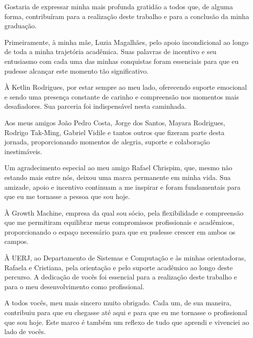 
Gostaria de expressar minha mais profunda gratidão a todos que, de alguma forma, contribuíram para a realização deste trabalho e para a conclusão da minha graduação.

Primeiramente, à minha mãe, Luzia Magalhães, pelo apoio incondicional ao longo de toda a minha trajetória acadêmica. Suas palavras de incentivo e seu entusiasmo com cada uma das minhas conquistas foram essenciais para que eu pudesse alcançar este momento tão significativo.

À Ketlin Rodrigues, por estar sempre ao meu lado, oferecendo suporte emocional e sendo uma presença constante de carinho e compreensão nos momentos mais desafiadores. Sua parceria foi indispensável nesta caminhada.

Aos meus amigos João Pedro Costa, Jorge dos Santos, Mayara Rodrigues, Rodrigo Tak-Ming, Gabriel Vidile e tantos outros que fizeram parte desta jornada, proporcionando momentos de alegria, suporte e colaboração inestimáveis.

Um agradecimento especial ao meu amigo Rafael Chrispim, que, mesmo não estando mais entre nós, deixou uma marca permanente em minha vida. Sua amizade, apoio e incentivo continuam a me inspirar e foram fundamentais para que eu me tornasse a pessoa que sou hoje.

À Growth Machine, empresa da qual sou sócio, pela flexibilidade e compreensão que me permitiram equilibrar meus compromissos profissionais e acadêmicos, proporcionando o espaço necessário para que eu pudesse crescer em ambos os campos.

À UERJ, ao Departamento de Sistemas e Computação e às minhas orientadoras, Rafaela e Cristiana, pela orientação e pelo suporte acadêmico ao longo deste percurso. A dedicação de vocês foi essencial para a realização deste trabalho e para o meu desenvolvimento como profissional.

A todos vocês, meu mais sincero muito obrigado. Cada um, de sua maneira, contribuiu para que eu chegasse até aqui e para que eu me tornasse o profissional que sou hoje. Este marco é também um reflexo de tudo que aprendi e vivenciei ao lado de vocês.

